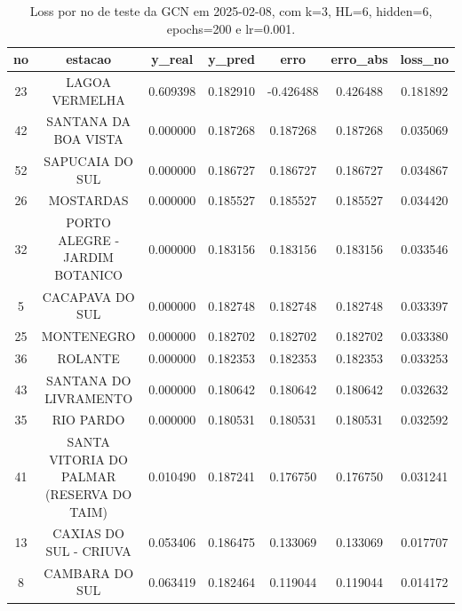 \begin{table}[h]
\centering
\caption{Loss por no de teste da GCN em 2025-02-08, com k=3, HL=6, hidden=6, epochs=200 e lr=0.001.}
\label{tab:gcn_loss_k3_hl6_h6_e200_d20250208}
\begin{tabular}{ccccccc}
\toprule
no & estacao & y\_real & y\_pred & erro & erro\_abs & loss\_no \\
\midrule
23 & LAGOA VERMELHA & 0.609398 & 0.182910 & -0.426488 & 0.426488 & 0.181892 \\
42 & SANTANA DA BOA VISTA & 0.000000 & 0.187268 & 0.187268 & 0.187268 & 0.035069 \\
52 & SAPUCAIA DO SUL & 0.000000 & 0.186727 & 0.186727 & 0.186727 & 0.034867 \\
26 & MOSTARDAS & 0.000000 & 0.185527 & 0.185527 & 0.185527 & 0.034420 \\
32 & PORTO ALEGRE - JARDIM BOTANICO & 0.000000 & 0.183156 & 0.183156 & 0.183156 & 0.033546 \\
5 & CACAPAVA DO SUL & 0.000000 & 0.182748 & 0.182748 & 0.182748 & 0.033397 \\
25 & MONTENEGRO & 0.000000 & 0.182702 & 0.182702 & 0.182702 & 0.033380 \\
36 & ROLANTE & 0.000000 & 0.182353 & 0.182353 & 0.182353 & 0.033253 \\
43 & SANTANA DO LIVRAMENTO & 0.000000 & 0.180642 & 0.180642 & 0.180642 & 0.032632 \\
35 & RIO PARDO & 0.000000 & 0.180531 & 0.180531 & 0.180531 & 0.032592 \\
41 & SANTA VITORIA DO PALMAR (RESERVA DO TAIM) & 0.010490 & 0.187241 & 0.176750 & 0.176750 & 0.031241 \\
13 & CAXIAS DO SUL - CRIUVA & 0.053406 & 0.186475 & 0.133069 & 0.133069 & 0.017707 \\
8 & CAMBARA DO SUL & 0.063419 & 0.182464 & 0.119044 & 0.119044 & 0.014172 \\
\bottomrule
\end{tabular}
\end{table}
